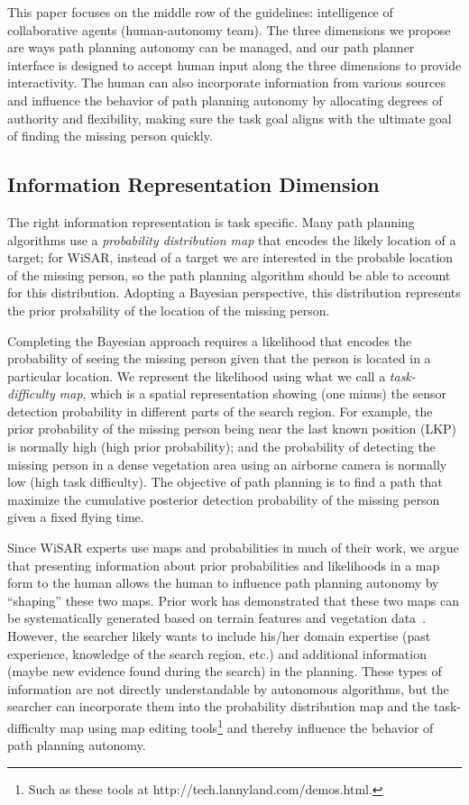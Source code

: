 \documentclass[lettersize, apacite, twoside, HRI]{apa_HRI}
\begin{document}
This paper focuses on the middle row of the guidelines: intelligence of collaborative agents (human-autonomy team). The three dimensions we propose are ways path planning autonomy can be managed, and our path planner interface is designed to accept human input along the three dimensions to provide interactivity. The human can also incorporate information from various sources and influence the behavior of path planning autonomy by allocating degrees of authority and flexibility, making sure the task goal aligns with the ultimate goal of finding the missing person quickly.

\subsection{Information Representation Dimension}

The right information representation is task specific. Many path planning algorithms use a \textit{probability distribution map} that encodes the likely location of a target; for WiSAR, instead of a target we are interested in the probable location of the missing person, so the path planning algorithm should be able to account for this distribution. Adopting a Bayesian perspective, this distribution represents the prior probability of the location of the missing person.

Completing the Bayesian approach requires a likelihood that encodes the probability of seeing the missing person given that the person is located in a particular location.  We represent the likelihood using what we call a \textit{task-difficulty map}, which is a spatial representation showing (one minus) the sensor detection probability in different parts of the search region. For example, the prior probability of the missing person being near the last known position (LKP) is normally high (high prior probability); and the probability of detecting the missing person in a dense vegetation area using an airborne camera is normally low (high task difficulty). The objective of path planning is to find a path that maximize the cumulative posterior detection probability of the missing person given a fixed flying time. 

Since WiSAR experts use maps and probabilities in much of their work, we argue that presenting information about prior probabilities and likelihoods in a map form to the human allows the human to influence path planning autonomy by ``shaping'' these two maps. Prior work has demonstrated that these two maps can be systematically generated based on terrain features and vegetation data~\cite{Lin2010Bayesian, Lin2014Hierarchical}. However, the searcher likely wants to include his/her domain expertise (past experience, knowledge of the search region, etc.) and additional information (maybe new evidence found during the search) in the planning. These types of information are not directly understandable by autonomous algorithms, but the searcher can incorporate them into the probability distribution map and the task-difficulty map using map editing tools\footnote{Such as these tools at http://tech.lannyland.com/demos.html.} and thereby influence the behavior of path planning autonomy.
\end{document}
